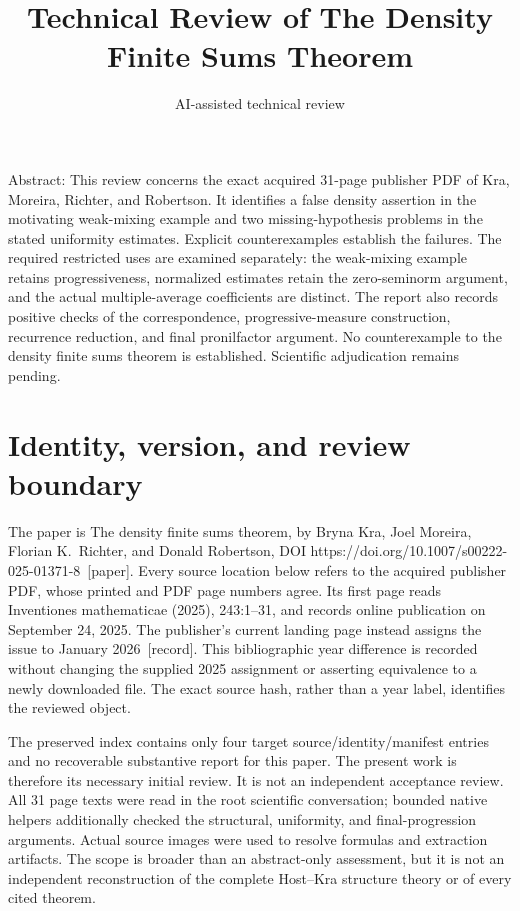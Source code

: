\documentclass[10pt]{article}
\title{Technical Review of
The Density Finite Sums Theorem}
\author{AI-assisted technical review}
\date{}
\begin{document}
\maketitle
Abstract: This review concerns the exact acquired 31-page publisher PDF of Kra, Moreira, Richter, and Robertson. It identifies a false density assertion in the motivating weak-mixing example and two missing-hypothesis problems in the stated uniformity estimates. Explicit counterexamples establish the failures. The required restricted uses are examined separately: the weak-mixing example retains progressiveness, normalized estimates retain the zero-seminorm argument, and the actual multiple-average coefficients are distinct. The report also records positive checks of the correspondence, progressive-measure construction, recurrence reduction, and final pronilfactor argument. No counterexample to the density finite sums theorem is established. Scientific adjudication remains pending.\par
\section*{Identity, version, and review boundary}
The paper is The density finite sums theorem, by Bryna Kra, Joel Moreira, Florian K. Richter, and Donald Robertson, DOI https://doi.org/10.1007/s00222-025-01371-8 [paper]. Every source location below refers to the acquired publisher PDF, whose printed and PDF page numbers agree. Its first page reads Inventiones mathematicae (2025), 243:1–31, and records online publication on September 24, 2025. The publisher’s current landing page instead assigns the issue to January 2026 [record]. This bibliographic year difference is recorded without changing the supplied 2025 assignment or asserting equivalence to a newly downloaded file. The exact source hash, rather than a year label, identifies the reviewed object.\par
The preserved index contains only four target source/identity/manifest entries and no recoverable substantive report for this paper. The present work is therefore its necessary initial review. It is not an independent acceptance review. All 31 page texts were read in the root scientific conversation; bounded native helpers additionally checked the structural, uniformity, and final-progression arguments. Actual source images were used to resolve formulas and extraction artifacts. The scope is broader than an abstract-only assessment, but it is not an independent reconstruction of the complete Host–Kra structure theory or of every cited theorem.\par
\end{document}
